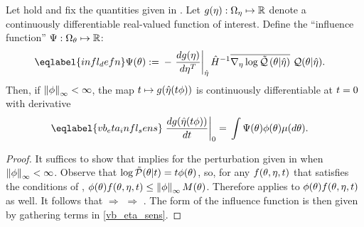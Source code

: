 \begin{cor}
%
Let  hold and fix the quantities given in
. Let $g(\eta): \Omega_{\eta} \mapsto \mathbb{R}$ denote a
continuously differentiable real-valued function of interest.  Define the
``influence function'' $\Psi: \Omega_{\theta} \mapsto \mathbb{R}$:
%
\begin{align}\eqlabel{infl_defn}
%
\infl(\theta) :={}&
    - \fracat{d g(\eta)}{ d \eta^T}{\etaopt} \hessopt^{-1}
        \lqgradbar{\theta \vert \etaopt}
        \q(\theta \vert \etaopt).
%
\end{align}
%
Then, if $\left\Vert\phi\right\Vert_{\infty} < \infty$, the map $t \mapsto g(\hat\eta(t \phi))$ is
continuously differentiable at $t=0$ with derivative
%
\begin{align}\eqlabel{vb_eta_infl_sens}
%
\fracat{d g(\etaopt(\t \phi))}{d \t}{0} ={}&
    \int \infl(\theta) \phi(\theta) \mu(d\theta).
%
\end{align}
%
\begin{proof}
%
It suffices to show that  implies
 for the perturbation given in 
when $\left\Vert\phi\right\Vert_{\infty} < \infty$.  Observe that $\log \tilde{\mathcal{P}}(\theta \vert t) = t
\phi(\theta)$, so, for any $f(\theta, \eta, t)$ that satisfies the conditions
of ,
%
%
$\phi(\theta) f(\theta, \eta, t) \le \left\Vert\phi\right\Vert_{\infty} M(\theta)$.
%
%
Therefore  applies to $\phi(\theta) f(\theta, \eta, t)$
as well.  It follows that  $\Rightarrow$
 $\Rightarrow$ .
%
The form of the influence function is then given by gathering terms in
\eqref{vb_eta_sens}.
%
\end{proof}
%
\end{cor}





